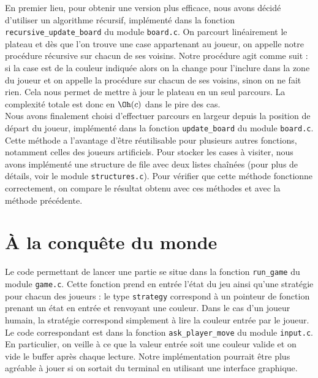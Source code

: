 \documentclass[12pt,S,fira-sans]{paper}
\begin{document}
\begin{qu}
    En premier lieu, pour obtenir une version plus efficace, nous avons décidé d'utiliser un algorithme récursif, implémenté dans la fonction \verb|recursive_update_board| du module \verb|board.c|.
    On parcourt linéairement le plateau et dès que l'on trouve une case appartenant au joueur, on appelle notre procédure récursive sur chacun de ses voisins.
    Notre procédure agit comme suit : si la case est de la couleur indiquée alors on la change pour l'inclure dans la zone du joueur et on appelle la procédure sur chacun de ses voisins, sinon on ne fait rien.
    Cela nous permet de mettre à jour le plateau en un seul parcours.
    La complexité totale est donc en \(\Oh(c)\) dans le pire des cas.\\
    Nous avons finalement choisi d'effectuer parcours en largeur depuis la position de départ du joueur, implémenté dans la fonction \verb|update_board| du module \verb|board.c|.
    Cette méthode a l'avantage d'être réutilisable pour plusieurs autres fonctions, notamment celles des joueurs artificiels.
    Pour stocker les cases à visiter, nous avons implémenté une structure de file avec deux listes chaînées (pour plus de détails, voir le module \verb|structures.c|).
    Pour vérifier que cette méthode fonctionne correctement, on compare le résultat obtenu avec ces méthodes et avec la méthode précédente.
\end{qu}

\section{À la conquête du monde}

\begin{qu}
    Le code permettant de lancer une partie se situe dans la fonction \verb|run_game| du module \verb|game.c|.
    Cette fonction prend en entrée l'état du jeu ainsi qu'une stratégie pour chacun des joueurs : le type \verb|strategy| correspond à un pointeur de fonction prenant un état en entrée et renvoyant une couleur.
    Dans le cas d'un joueur humain, la stratégie correspond simplement à lire la couleur entrée par le joueur.
    Le code correspondant est dans la fonction \verb|ask_player_move| du module \verb|input.c|.
    En particulier, on veille à ce que la valeur entrée soit une couleur valide et on vide le buffer après chaque lecture.
    Notre implémentation pourrait être plus agréable à jouer si on sortait du terminal en utilisant une interface graphique.
\end{qu}
\end{document}
